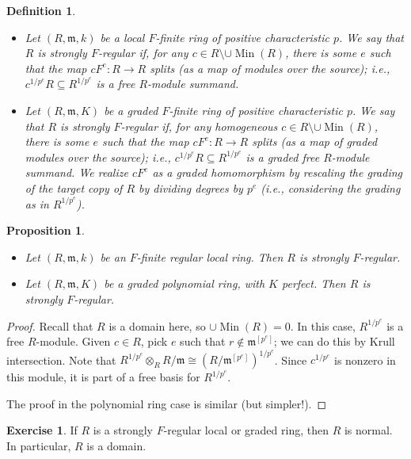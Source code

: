 \documentclass[11pt]{book}
\newtheorem{proposition}[theorem]{Proposition}
\newtheorem{definition}[theorem]{Definition}
\numberwithin{equation}{section}
\numberwithin{theorem}{chapter}
\theoremstyle{definition}
\newtheorem{exercise}[theorem]{Exercise}
\newtheorem*{basic properties}{Basic Properties}
\newtheorem*{Important Remark}{Important Remark}
\theoremstyle{remark}
\newcommand{\m}{\mathfrak{m}}
\newcommand{\Min}{\operatorname{Min}}
\begin{document}
\begin{definition}
	\
	\begin{itemize}
		\item Let $(R,\m,k)$ be a local $F$-finite ring of positive characteristic $p$. We say that $R$ is \emph{strongly $F$-regular} if, for any $c\in R\setminus \cup \Min(R)$, there is some $e$ such that the map $c F^e:R\to R$ splits (as a map of modules over the source); i.e., $c^{1/p^e} R \subseteq R^{1/p^e}$ is a free $R$-module summand.
		\item Let $(R,\m,K)$ be a graded $F$-finite ring of positive characteristic $p$. We say that $R$ is \emph{strongly $F$-regular}\index{strongly $F$-regular} if, for any homogeneous $c\in R\setminus \cup \Min(R)$, there is some $e$ such that the map $c F^e:R\to R$ splits (as a map of graded modules over the source); i.e., $c^{1/p^e} R \subseteq R^{1/p^e}$ is a graded free $R$-module summand. We realize $cF^e$ as a graded homomorphism by rescaling the grading of the target copy of $R$ by dividing degrees by $p^e$ (i.e., considering the grading as in $R^{1/p^e}$).
	\end{itemize}
\end{definition}


\begin{proposition} 
	\
	\begin{itemize}
		\item Let $(R,\m,k)$ be an $F$-finite regular local ring. Then $R$ is strongly $F$-regular.
		\item Let $(R,\m,K)$ be a graded polynomial ring, with $K$ perfect. Then $R$ is strongly $F$-regular.
	\end{itemize}
	\end{proposition}
\begin{proof} Recall that $R$ is a domain here, so $\cup \Min(R)=0$.
	In this case, $R^{1/p^e}$ is a free $R$-module. Given $c\in R$, pick $e$ such that $r\notin \m^{[p^e]}$; we can do this by Krull intersection. Note that $R^{1/p^e} \otimes_R R/\m \cong (R/\m^{[p^e]})^{1/p^e}$. Since $c^{1/p^e}$ is nonzero in this module, it is part of a free basis for $R^{1/p^e}$.
	
	The proof in the polynomial ring case is similar (but simpler!).
\end{proof}

\begin{exercise}
	If $R$ is a strongly $F$-regular local or graded ring, then $R$ is normal. In particular, $R$ is a domain.
\end{exercise}
\end{document}
